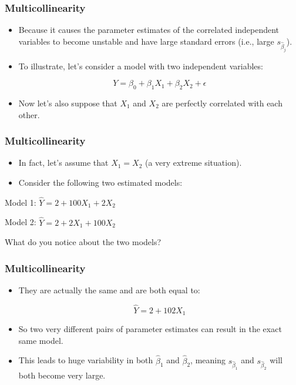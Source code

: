 \documentclass[14pt]{beamer}
\begin{document}
\begin{frame}
	\frametitle{Multicollinearity}
	
	\begin{itemize}[label={\color{blue}$\blacktriangleright$}]
		\item Because it causes the parameter estimates of the correlated independent variables to become unstable and have large standard errors (i.e., large $s_{\hat{\beta}_j}$).
		
		\item To illustrate, let's consider a model with two independent variables:
		
		\[
		Y = \beta_0 + \beta_1X_1 + \beta_2X_2 + \epsilon
		\]
		
		\item Now let's also suppose that $X_1$ and $X_2$ are perfectly correlated with each other.
	\end{itemize}
	
\end{frame}
\begin{frame}
	\frametitle{Multicollinearity}
	
	\begin{itemize}[label={\color{blue}$\blacktriangleright$}]
		\item In fact, let's assume that $X_1 = X_2$ (a very extreme situation).
		
		\item Consider the following two estimated models:
	\end{itemize}
	
	\begin{center}
		Model 1: $\hat{Y} = 2 + 100X_1 + 2X_2$
		
		Model 2: $\hat{Y} = 2 + 2X_1 + 100X_2$
	\end{center}
	
	What do you notice about the two models?
	
\end{frame}
\begin{frame}
	\frametitle{Multicollinearity}
	
	\begin{itemize}[label={\color{blue}$\blacktriangleright$}]
		\item They are actually the same and are both equal to:
		
		\[
		\hat{Y} = 2 + 102X_1
		\]
		
		\item So two very different pairs of parameter estimates can result in the exact same model.
		
		\item This leads to huge variability in both $\hat{\beta}_1$ and $\hat{\beta}_2$, meaning $s_{\hat{\beta}_1}$ and $s_{\hat{\beta}_2}$ will both become very large.
	\end{itemize}
	
\end{frame}
\end{document}
